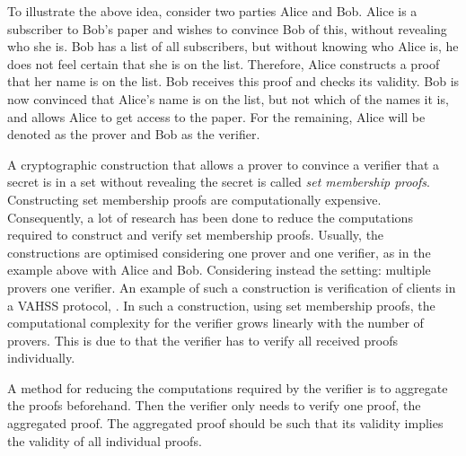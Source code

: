 
To illustrate the above idea, consider two parties Alice and Bob. Alice is a subscriber to Bob's paper and wishes to convince Bob of this, without revealing who she is. Bob has a list of all subscribers, but without knowing who Alice is, he does not feel certain that she is on the list. Therefore, Alice constructs a proof that her name is on the list. Bob receives this proof and checks its validity. Bob is now convinced that Alice's name is on the list, but not which of the names it is, and allows Alice to get access to the paper.  For the remaining, Alice will be denoted as the prover and Bob as the verifier.

A cryptographic construction that allows a prover to convince a verifier that a secret is in a set without revealing the secret is called \textit{set membership proofs}.  %
Constructing set membership proofs are computationally expensive. Consequently, a lot of research has been done to reduce the computations required to construct and verify set membership proofs. Usually, the constructions are optimised considering one prover and one verifier, as in the example above with Alice and Bob. Considering instead the setting: multiple provers one verifier. An example of such a construction is verification of clients in a VAHSS protocol, \cite{SumItUp}. In such a construction, using set membership proofs, the computational complexity for the verifier grows linearly with the number of provers. This is due to that the verifier has to verify all received proofs individually.  

A method for reducing the computations required by the verifier is to aggregate the proofs beforehand. Then the verifier only needs to verify one proof, the aggregated proof. The aggregated proof should be such that its validity implies the validity of all individual proofs.

